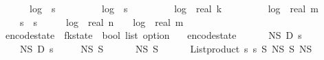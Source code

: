 \begin{isabellebody}
\ \ \ \ {}\ {\isacharasterisk}{\kern0pt}\ log\ {}\ {\isacharparenleft}{\kern0pt}s\ {\isacharplus}{\kern0pt}\ {}{\isacharparenright}{\kern0pt}\ {\isacharplus}{\kern0pt}\isanewline
\ \ \ \ {}\ {\isacharasterisk}{\kern0pt}\ log\ {}\ {\isacharparenleft}{\kern0pt}s\ {\isacharplus}{\kern0pt}\ {}{\isacharparenright}{\kern0pt}\ {\isacharplus}{\kern0pt}\isanewline
\ \ \ \ {}\ {\isacharasterisk}{\kern0pt}\ log\ {}\ {\isacharparenleft}{\kern0pt}real\ k\ {\isacharplus}{\kern0pt}\ {}{\isacharparenright}{\kern0pt}\ {\isacharplus}{\kern0pt}\isanewline
\ \ \ \ {}\ {\isacharasterisk}{\kern0pt}\ log\ {}\ {\isacharparenleft}{\kern0pt}real\ m\ {\isacharplus}{\kern0pt}\ {}{\isacharparenright}{\kern0pt}\ {\isacharplus}{\kern0pt}\isanewline
\ \ \ \ s\ {\isacharasterisk}{\kern0pt}\ s\ {\isacharasterisk}{\kern0pt}\ {\isacharparenleft}{\kern0pt}{}\ {\isacharplus}{\kern0pt}\ {}\ {\isacharasterisk}{\kern0pt}\ log\ {}\ {\isacharparenleft}{\kern0pt}real\ n{\isacharplus}{\kern0pt}{}{\isacharparenright}{\kern0pt}\ {\isacharplus}{\kern0pt}\ {}\ {\isacharasterisk}{\kern0pt}\ log\ {}\ {\isacharparenleft}{\kern0pt}real\ m{\isacharplus}{\kern0pt}{}{\isacharparenright}{\kern0pt}{\isacharparenright}{\kern0pt}{\isacharparenright}{\kern0pt}{\isachardoublequoteclose}\isanewline
\isanewline
{}\isamarkupfalse%
\ encode{\isacharunderscore}{\kern0pt}state\ {\isacharcolon}{\kern0pt}{\isacharcolon}{\kern0pt}\ {\isachardoublequoteopen}fk{\isacharunderscore}{\kern0pt}state\ {\isasymRightarrow}\ bool\ list\ option{\isachardoublequoteclose}\ \isanewline
\ \ {\isachardoublequoteopen}encode{\isacharunderscore}{\kern0pt}state\ {\isacharequal}{\kern0pt}\ \isanewline
\ \ \ \ N\isactrlsub S\ {\isasymtimes}\isactrlsub D\ {\isacharparenleft}{\kern0pt}{\isasymlambda}s\ \isanewline
\ \ \ \ N\isactrlsub S\ {\isasymtimes}\isactrlsub D\ {\isacharparenleft}{\kern0pt}{\isasymlambda}s\ \isanewline
\ \ \ \ N\isactrlsub S\ {\isasymtimes}\isactrlsub S\ \ \isanewline
\ \ \ \ N\isactrlsub S\ {\isasymtimes}\isactrlsub S\ \ \isanewline
\ \ \ \ {\isacharparenleft}{\kern0pt}List{\isachardot}{\kern0pt}product\ {\isacharbrackleft}{\kern0pt}{}{\isachardot}{\kern0pt}{\isachardot}{\kern0pt}{\isacharless}{\kern0pt}s\ {\isacharbrackleft}{\kern0pt}{}{\isachardot}{\kern0pt}{\isachardot}{\kern0pt}{\isacharless}{\kern0pt}s\ {\isasymrightarrow}\isactrlsub S\ {\isacharparenleft}{\kern0pt}N\isactrlsub S\ {\isasymtimes}\isactrlsub S\ N\isactrlsub S{\isacharparenright}{\kern0pt}{\isacharparenright}{\kern0pt}{\isacharparenright}{\kern0pt}{\isacharparenright}{\kern0pt}{\isachardoublequoteclose}\isanewline

\end{isabellebody}
